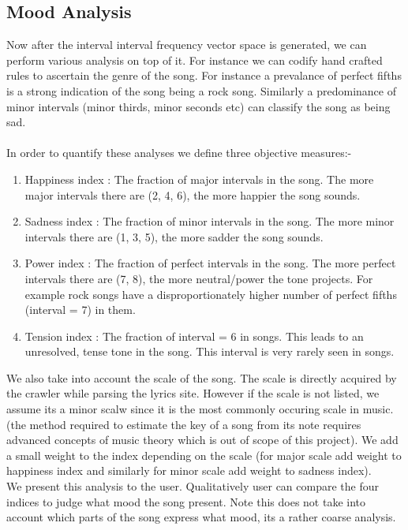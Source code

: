 \documentclass[letterpaper, 11pt]{article}
\begin{document}
\subsection*{Mood Analysis}
Now after the interval interval frequency vector space is generated, we can perform various analysis on top of it. For instance we can codify hand crafted rules to ascertain the genre of the song. For instance a prevalance of perfect fifths is a strong indication of the song being a rock song. Similarly a predominance of minor intervals (minor thirds, minor seconds etc) can classify the song as being sad. \\\\
In order to quantify these analyses we define three objective measures:-
\begin{enumerate}
\item Happiness index : The fraction of major intervals in the song. The more major intervals there are (2, 4, 6), the more happier the song sounds. 
\item Sadness index : The fraction of minor intervals in the song. The more minor intervals there are (1, 3, 5), the more sadder the song sounds. 
\item Power index : The fraction of perfect intervals in the song. The more perfect intervals there are (7, 8), the more neutral/power the tone projects. For example rock songs have a disproportionately higher number of perfect fifths (interval = 7) in them.
\item Tension index : The fraction of interval = 6 in songs. This leads to an unresolved, tense tone in the song. This interval is very rarely seen in songs.
\end{enumerate}
We also take into account the scale of the song. The scale is directly acquired by the crawler while parsing the lyrics site. However if the scale is not listed, we assume its a minor scalw since it is the most commonly occuring scale in music. (the method required to estimate the key of a song from its note requires advanced concepts of music theory which is out of scope of this project). We add a small weight to the index depending on the scale (for major scale add weight to happiness index and similarly for minor scale add weight to sadness index). \\
We present this analysis to the user. Qualitatively user can compare the four indices to judge what mood the song present. Note this does not take into account which parts of the song express what mood, its a rather coarse analysis.
\end{document}
